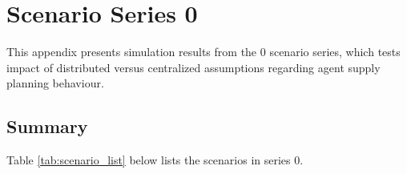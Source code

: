 \chapter{Scenario Series 0}
\label{ap:scenario_series_0}

This appendix presents simulation results from the 0 scenario series, which tests impact of distributed versus centralized assumptions regarding agent supply planning behaviour. 

\section{Summary}
Table \ref{tab:scenario_list} below lists the scenarios in series 0. 


